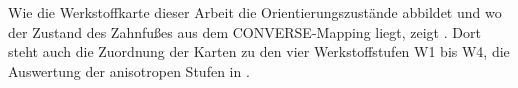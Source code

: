Wie die Werkstoffkarte dieser Arbeit die Orientierungszustände abbildet und wo der Zustand des Zahnfußes aus dem CONVERSE-Mapping liegt, zeigt . Dort steht auch die Zuordnung der Karten zu den vier Werkstoffstufen W1 bis W4, die Auswertung der anisotropen Stufen in .



